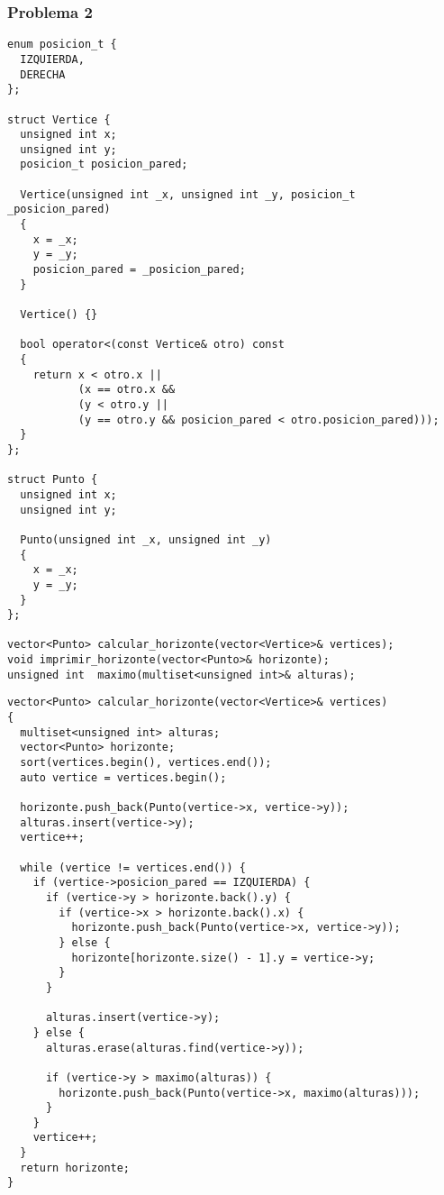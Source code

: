 \documentclass[a4paper]{article}
\begin{document}
\newpage

\subsubsection{Problema 2}



\begin{lstlisting}
enum posicion_t {
  IZQUIERDA,
  DERECHA
};

struct Vertice {
  unsigned int x;
  unsigned int y;
  posicion_t posicion_pared;

  Vertice(unsigned int _x, unsigned int _y, posicion_t _posicion_pared)
  {
    x = _x;
    y = _y;
    posicion_pared = _posicion_pared;
  }

  Vertice() {}

  bool operator<(const Vertice& otro) const
  {
    return x < otro.x ||
           (x == otro.x &&
           (y < otro.y ||
           (y == otro.y && posicion_pared < otro.posicion_pared)));
  }
};

struct Punto {
  unsigned int x;
  unsigned int y;

  Punto(unsigned int _x, unsigned int _y)
  {
    x = _x;
    y = _y;
  }
};

vector<Punto> calcular_horizonte(vector<Vertice>& vertices);
void imprimir_horizonte(vector<Punto>& horizonte);
unsigned int  maximo(multiset<unsigned int>& alturas);
\end{lstlisting} 

\newpage	

\begin{lstlisting}
vector<Punto> calcular_horizonte(vector<Vertice>& vertices)
{
  multiset<unsigned int> alturas;
  vector<Punto> horizonte;
  sort(vertices.begin(), vertices.end());
  auto vertice = vertices.begin();

  horizonte.push_back(Punto(vertice->x, vertice->y));
  alturas.insert(vertice->y);
  vertice++;

  while (vertice != vertices.end()) {
    if (vertice->posicion_pared == IZQUIERDA) {
      if (vertice->y > horizonte.back().y) {
        if (vertice->x > horizonte.back().x) {
          horizonte.push_back(Punto(vertice->x, vertice->y));
        } else {
          horizonte[horizonte.size() - 1].y = vertice->y;
        }
      }

      alturas.insert(vertice->y);
    } else {
      alturas.erase(alturas.find(vertice->y));
      
      if (vertice->y > maximo(alturas)) {
        horizonte.push_back(Punto(vertice->x, maximo(alturas)));
      }
    }
    vertice++;
  }
  return horizonte;
}
\end{lstlisting}
\end{document}
